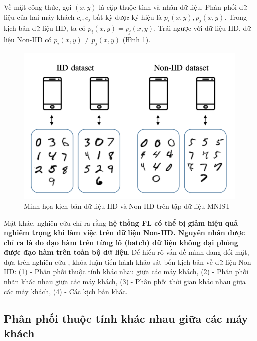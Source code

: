 Về mặt công thức, gọi $(x, y)$ là cặp thuộc tính và nhãn dữ liệu. Phân phối dữ liệu của hai máy khách $c_i, c_j$ bất kỳ được ký hiệu là $p_i(x,y), p_j(x,y)$. Trong kịch bản dữ liệu IID, ta có $p_i(x,y) = p_j(x,y)$. Trái ngược với dữ liệu IID, dữ liệu Non-IID có $p_i(x,y) \ne p_j(x,y)$ (Hình \ref{fig:iid_noniid}).

\begin{figure}[H]
    \centering
    \includegraphics[scale=0.7]{../images/iid_vs_noniid.png}
    \caption{Minh họa kịch bản dữ liệu IID và Non-IID trên tập dữ liệu MNIST \cite{hellstrom2020wireless}}
    \label{fig:iid_noniid}
\end{figure}


Mặt khác, nghiên cứu \cite{zhao2018federated} chỉ ra rằng \textbf{hệ thống FL có thể bị giảm hiệu quả nghiêm trọng khi làm việc trên dữ liệu Non-IID. Nguyên nhân được chỉ ra là do đạo hàm trên từng lô (batch) dữ liệu không đại phỏng được đạo hàm trên toàn bộ dữ liệu}. Để hiểu rõ vấn đề mình đang đối mặt, dựa trên nghiên cứu \cite{zhu2021federated}, khóa luận tiến hành khảo sát bốn kịch bản về dữ liệu Non-IID: (1) - Phân phối thuộc tính khác nhau giữa các máy khách, (2) - Phân phối nhãn khác nhau giữa các máy khách, (3) - Phân phối thời gian khác nhau giữa các máy khách, (4) - Các kịch bản khác.

\subsection{Phân phối thuộc tính khác nhau giữa các máy khách}

